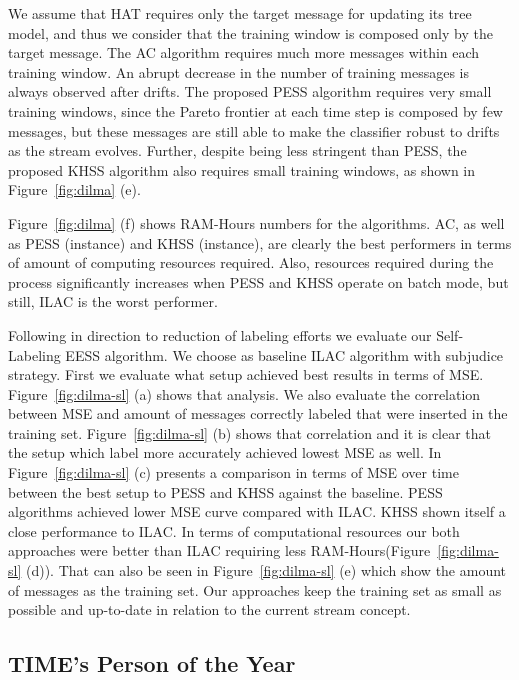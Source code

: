 We assume that HAT requires only the target message for updating its tree model, and thus we consider that the training window is composed only by the target message. The AC algorithm requires much more
messages within each training window. An abrupt decrease in the number of training messages is always observed after drifts.
The proposed PESS algorithm requires very small training windows, since the Pareto frontier at each time step is composed by few messages, but these messages are still able to make the classifier robust to drifts as the stream evolves. Further, despite being less stringent than PESS, the proposed KHSS algorithm also requires small training windows, as shown in Figure~\ref{fig:dilma} (e).

Figure~\ref{fig:dilma} (f) shows RAM-Hours numbers for the algorithms. AC, as well as PESS (instance) and KHSS (instance), are clearly the best performers in terms of amount of computing resources required. Also, resources required during the process significantly increases when PESS and KHSS operate on batch mode, but still, ILAC is the worst performer.

Following in direction to reduction of labeling efforts we evaluate our Self-Labeling EESS algorithm. We choose as baseline ILAC algorithm with subjudice strategy. First we evaluate what setup achieved best results in terms of MSE. Figure~\ref{fig:dilma-sl} (a) shows that analysis. We also evaluate the correlation between MSE and amount of messages correctly labeled that were inserted in the training set. Figure~\ref{fig:dilma-sl} (b) shows that correlation and it is clear that the setup which label more accurately achieved lowest MSE as well. In Figure~\ref{fig:dilma-sl} (c) presents a comparison in terms of MSE over time between the best setup to PESS and KHSS against the baseline. PESS algorithms achieved lower MSE curve compared with ILAC. KHSS shown itself a close performance to ILAC. In terms of computational resources our both approaches were better than ILAC requiring less RAM-Hours(Figure~\ref{fig:dilma-sl} (d)). That can also be seen in Figure~\ref{fig:dilma-sl} (e) which show the amount of messages as the training set. Our approaches keep the training set as small as possible and up-to-date in relation to the current stream concept. 

\subsection{TIME's Person of the Year}

